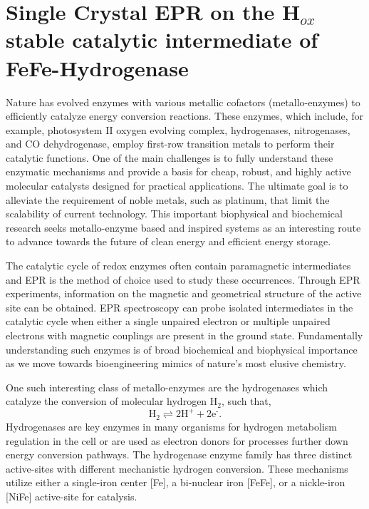 \chapter[Single-Crystal EPR on FeFe-Hydrogenase]{Single Crystal EPR on the H$_{ox}$ stable catalytic intermediate of FeFe-Hydrogenase}

Nature has evolved enzymes with various metallic cofactors (metallo-enzymes) to efficiently catalyze energy conversion reactions. These enzymes, which include, for example, photosystem II oxygen evolving complex\cite{CoxOEC}, hydrogenases\cite{lubitzhyd}, nitrogenases\cite{Hoffman2014rev}, and CO dehydrogenase\cite{C5CS00182J}, employ first-row transition metals to perform their catalytic functions. One of the main challenges is to fully understand these enzymatic mechanisms and provide a basis for cheap, robust, and highly active molecular catalysts designed for practical applications. \cite{Lewis15729} The ultimate goal is to alleviate the requirement of noble metals, such as platinum, that limit the scalability of current technology. This important biophysical and biochemical research seeks metallo-enzyme based and inspired systems as an interesting route to advance towards the future of clean energy and efficient energy storage. \cite{schlogl2012chemical}

The catalytic cycle of redox enzymes often contain paramagnetic intermediates and EPR is the method of choice used to study these occurrences. Through EPR experiments, information on the magnetic and geometrical structure of the active site can be obtained. EPR spectroscopy can probe isolated intermediates in the catalytic cycle when either a single unpaired electron or multiple unpaired electrons with magnetic couplings are present in the ground state. Fundamentally understanding such enzymes is of broad biochemical and biophysical importance as we move towards bioengineering mimics of nature’s most elusive chemistry. \cite{WATANABE20171}

One such interesting class of metallo-enzymes are the hydrogenases\cite{lubitzhyd} which catalyze the conversion of molecular hydrogen H$_2$, such that,
\begin{equation}
    \text{H}_2 \rightleftharpoons 2 \text{H}^+ + 2\text{e}^{\text{-}}.
\end{equation}
Hydrogenases are key enzymes in many organisms for hydrogen metabolism regulation in the cell or are used as electron donors for processes further down energy conversion pathways. The hydrogenase enzyme family has three distinct active-sites with different mechanistic hydrogen conversion. These mechanisms utilize either a single-iron center [Fe], a bi-nuclear iron [FeFe], or a nickle-iron [NiFe] active-site for catalysis.

